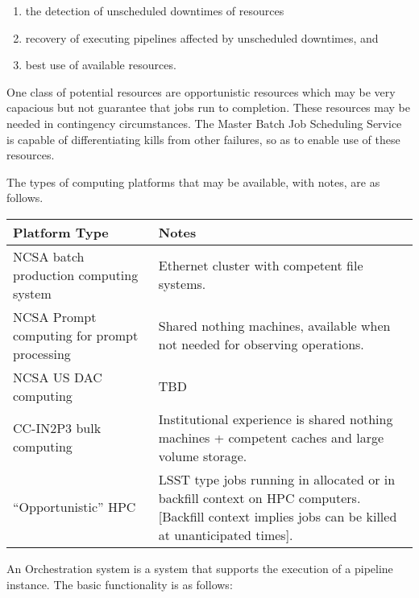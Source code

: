 \begin{enumerate}

\item the detection of unscheduled downtimes of resources

\item recovery of executing pipelines affected by unscheduled downtimes, and

\item best use of available resources.

\end{enumerate}

One class of potential resources  are opportunistic resources which may be very
capacious but not guarantee that jobs run to completion. These resources may be
needed in contingency circumstances. The Master Batch Job Scheduling Service is
capable of differentiating kills from other failures, so as to enable use of
these resources.

The types of computing platforms that may be available, with notes, are as
follows.

\begin{longtable}{|p{}|p{}|}\hline
\textbf{Platform Type} & \textbf{Notes} \\\hline
NCSA batch production computing system & Ethernet cluster with competent
file systems. \\\hline
NCSA Prompt computing for prompt processing & Shared nothing machines, available
when not needed for observing operations. \\\hline
NCSA US DAC computing & TBD \\\hline
CC-IN2P3 bulk computing & Institutional experience is shared nothing machines +
competent caches
and large volume storage. \\\hline
``Opportunistic'' HPC & LSST type jobs  running in allocated or in  backfill
context on HPC computers. [Backfill context implies jobs can be killed at
unanticipated times]. \\\hline
\end{longtable}

An Orchestration system is a system that supports the execution of a pipeline
instance. The basic functionality is as follows:

